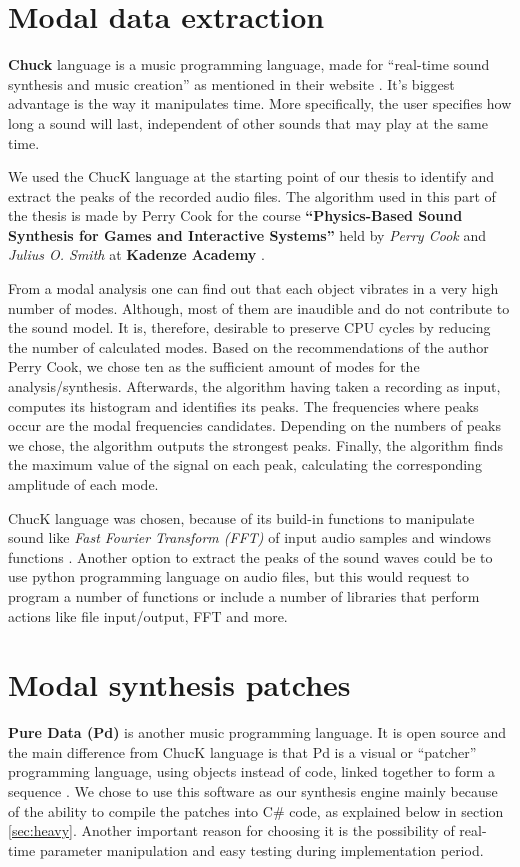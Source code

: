\section{Modal data extraction}\label{sec:chuck}
\textbf{Chuck} language is a music programming language, made for ``real-time sound synthesis and music creation'' as mentioned in their website \cite{bib:chuck}. It's biggest advantage is the way it manipulates time. More specifically, the user specifies how long a sound will last, independent of other sounds that may play at the same time.

We used the ChucK language at the starting point of our thesis to identify and extract the peaks of the recorded audio files. The algorithm used in this part of the thesis is made by Perry Cook for the course \textbf{``Physics-Based Sound Synthesis for Games and Interactive Systems''} held by \textit{Perry Cook} and \textit{Julius O. Smith} at \textbf{Kadenze Academy} \cite{bib:physicsbasedcourse}.

From a modal analysis one can find out that each object vibrates in a very high number of modes. Although, most of them are inaudible and do not contribute to the sound model. It is, therefore, desirable to preserve CPU cycles by reducing the number of calculated modes. Based on the recommendations of the author Perry Cook, we chose ten as the sufficient amount of modes for the analysis/synthesis.  Afterwards, the algorithm having taken a recording as input, computes its histogram and identifies its peaks. The frequencies where peaks occur are the modal frequencies candidates. Depending on the numbers of peaks we chose, the algorithm outputs the strongest peaks. Finally, the algorithm finds the maximum value of the signal on each peak, calculating the corresponding amplitude of each mode.

ChucK language was chosen, because of its build-in functions to manipulate sound like \textit{Fast Fourier Transform (FFT)} of input audio samples and windows functions \cite{bib:chuck_doc}. Another option to extract the peaks of the sound waves could be to use python programming language on audio files, but this would request to program a number of functions or include a number of libraries that perform actions like file input/output, FFT and more. 

 
\section{Modal synthesis patches}
\textbf{Pure Data (Pd)} is another music programming language. It is open source and the main difference from ChucK language is that Pd is a visual or ``patcher'' programming language, using objects instead of code, linked together to form a sequence \cite{bib:pd}. We chose to use this software as our synthesis engine mainly because of the ability to compile the patches into C\# code, as explained below in section \ref{sec:heavy}. Another important reason for choosing it is the possibility of real-time parameter manipulation and easy testing during implementation period.

